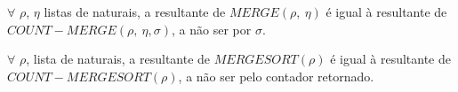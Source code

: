 \begin{lemma}
    \label{cmerge_equiv_merge}
    $\forall$ $\rho$, $\eta$ listas de naturais, a resultante de $MERGE(\rho,\ \eta)$
    é igual à resultante de $COUNT-MERGE(\rho,\ \eta, \sigma)$, a não ser por $\sigma$.
\end{lemma}

\begin{lemma}
  \label{cmergesort_equiv_mergesort}
  $\forall$ $\rho$, lista de naturais, a resultante de $MERGESORT(\rho)$
  é igual à resultante de $COUNT-MERGESORT(\rho)$, a não ser pelo contador retornado.
\end{lemma}